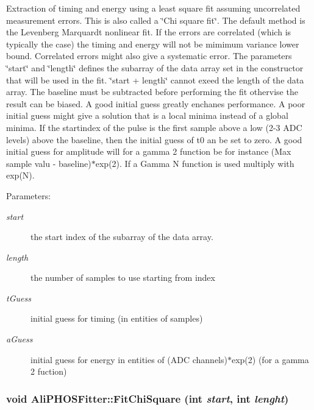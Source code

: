 Extraction of timing and energy using a least square fit assuming uncorrelated measurement errors. This is also called a \char`\"{}Chi square fit\char`\"{}. The default method is the Levenberg Marquardt nonlinear fit. If the errors are correlated (which is typically the case) the timing and energy will not be mimimum variance lower bound. Correlated errors might also give a systematic error. The parameters \char`\"{}start\char`\"{} and \char`\"{}length\char`\"{} defines the subarray of the data array set in the constructor that will be used in the fit. \char`\"{}start + length\char`\"{} cannot exeed the length of the data array. The baseline must be subtracted before performing the fit othervise the result can be biased. A good initial guess greatly enchanes performance. A poor initial guess might give a solution that is a local minima instead of a global minima. If the startindex of the pulse is the first sample above a low (2-3 ADC levels) above the baseline, then the initial guess of t0 an be set to zero. A good initial guess for amplitude will for a gamma 2 function be for instance (Max sample valu - baseline)$\ast$exp(2). If a Gamma N function is used multiply with exp(N). \begin{Desc}
\item[Parameters:]
\begin{description}
\item[{\em start}]the start index of the subarray of the data array. \item[{\em length}]the number of samples to use starting from index \item[{\em t\-Guess}]initial guess for timing (in entities of samples) \item[{\em a\-Guess}]initial guess for energy in entities of (ADC channels)$\ast$exp(2) (for a gamma 2 fuction) \end{description}
\end{Desc}
\subsubsection{\setlength{\rightskip}{0pt plus 5cm}void Ali\-PHOSFitter::Fit\-Chi\-Square (int {\em start}, int {\em lenght})}\label{classAliPHOSFitter_a5}


